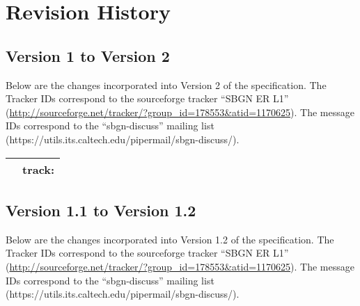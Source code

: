 \chapter{Revision History}

\section{Version 1 to Version 2}

Below are the changes incorporated into Version 2 of the \SBGNERLone specification. The Tracker IDs correspond to the sourceforge tracker ``SBGN ER L1'' (\url{http://sourceforge.net/tracker/?group_id=178553&atid=1170625}). The message IDs correspond to the ``sbgn-discuss'' mailing list (https://utils.its.caltech.edu/pipermail/sbgn-discuss/).

\begin{center}
\label{tab:revision history 1.2}
\tablelasttail{\hline}
\begin{supertabular}{|p{0.75\textwidth}|p{0.25\textwidth}|}\hline
 & track:  \\\hline
\end{supertabular}
\end{center}


\section{Version 1.1 to Version 1.2}

Below are the changes incorporated into Version 1.2 of the \SBGNERLone specification. The Tracker IDs correspond to the sourceforge tracker ``SBGN ER L1'' (\url{http://sourceforge.net/tracker/?group_id=178553&atid=1170625}). The message IDs correspond to the ``sbgn-discuss'' mailing list (https://utils.its.caltech.edu/pipermail/sbgn-discuss/).

